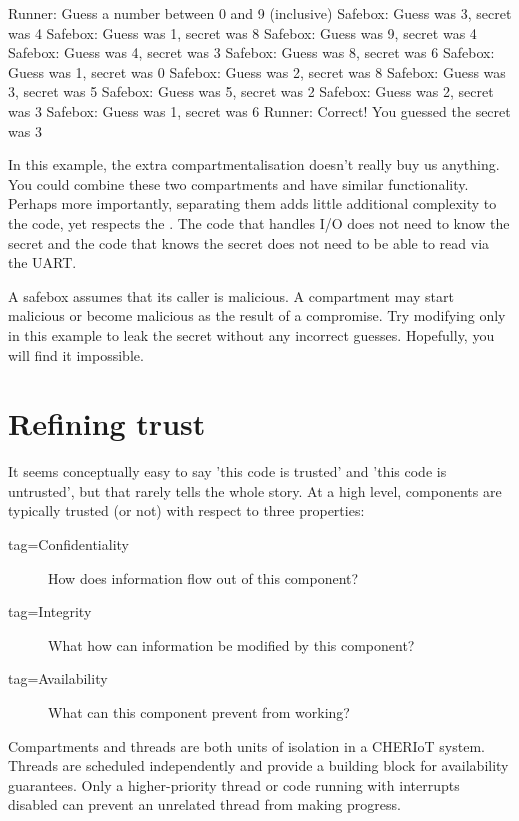 \begin{console}
Runner: Guess a number between 0 and 9 (inclusive)
Safebox: Guess was 3, secret was 4
Safebox: Guess was 1, secret was 8
Safebox: Guess was 9, secret was 4
Safebox: Guess was 4, secret was 3
Safebox: Guess was 8, secret was 6
Safebox: Guess was 1, secret was 0
Safebox: Guess was 2, secret was 8
Safebox: Guess was 3, secret was 5
Safebox: Guess was 5, secret was 2
Safebox: Guess was 2, secret was 3
Safebox: Guess was 1, secret was 6
Runner: Correct!  You guessed the secret was 3
\end{console}

In this example, the extra compartmentalisation doesn't really buy us anything.
You could combine these two compartments and have similar functionality.
Perhaps more importantly, separating them adds little additional complexity to the code, yet respects the .
The code that handles I/O does not need to know the secret and the code that knows the secret does not need to be able to read via the UART.

A safebox assumes that its caller is malicious.
A compartment may start malicious or become malicious as the result of a compromise.
Try modifying only  in this example to leak the secret without any incorrect guesses.
Hopefully, you will find it impossible.

\section{Refining trust}

It seems conceptually easy to say 'this code is trusted' and 'this code is untrusted', but that rarely tells the whole story.
At a high level, components are typically trusted (or not) with respect to three properties:

\begin{description}
	\item[tag=Confidentiality]{How does information flow out of this component?}
	\item[tag=Integrity]{What how can information be modified by this component?}
	\item[tag=Availability]{What can this component prevent from working?}
\end{description}

\begin{note}
Compartments and threads are both units of isolation in a CHERIoT system.
Threads are scheduled independently and provide a building block for availability guarantees.
Only a higher-priority thread or code running with interrupts disabled can prevent an unrelated thread from making progress.
\end{note}

